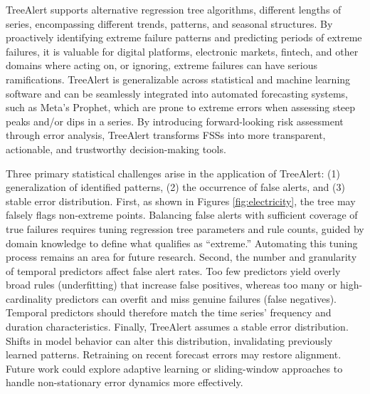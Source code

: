 \documentclass[ijds,sglanonrev]{informs4}
\begin{document}
 TreeAlert supports alternative regression tree algorithms, different lengths of series, encompassing different trends, patterns, and seasonal structures. By proactively identifying extreme failure patterns and predicting periods of extreme failures,  it is valuable for digital platforms, electronic markets, fintech, and other domains where acting on, or ignoring, extreme failures can have serious ramifications. TreeAlert is generalizable across statistical and machine learning software and  can be seamlessly integrated into automated forecasting systems, such as Meta’s Prophet, which are prone to extreme errors when assessing steep peaks and/or dips in a series. By introducing forward-looking risk assessment through error analysis, TreeAlert transforms FSSs into more transparent, actionable, and trustworthy decision-making tools.

Three primary statistical challenges arise in the application of TreeAlert: (1) generalization of identified patterns, (2) the occurrence of false alerts, and (3) stable error distribution. First, as shown in Figures \ref{fig:electricity}, the tree may falsely flags non-extreme points. Balancing false alerts with sufficient coverage of true failures requires tuning regression tree parameters and rule counts, guided by domain knowledge to define what qualifies as “extreme.” Automating this tuning process remains an area for future research. Second, the number and granularity of temporal predictors  affect false alert rates. Too few predictors yield overly broad rules (underfitting) that increase false positives, whereas too many or high-cardinality predictors can overfit and miss genuine failures (false negatives). Temporal predictors should therefore match the time series’ frequency and duration characteristics. Finally, TreeAlert assumes a stable error distribution. Shifts in model behavior can alter this distribution, invalidating previously learned patterns. Retraining on recent forecast errors may restore alignment. Future work could explore adaptive learning or sliding-window approaches to handle non-stationary error dynamics more effectively.
\end{document}
